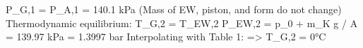 P_G,1 = P_A,1 = 140.1 kPa (Mass of EW, piston, and form do not change)  
Thermodynamic equilibrium: T_G,2 = T_EW,2  
P_EW,2 = p_0 + m_K g / A = 139.97 kPa = 1.3997 bar  
Interpolating with Table 1:  
=> T_G,2 = 0°C